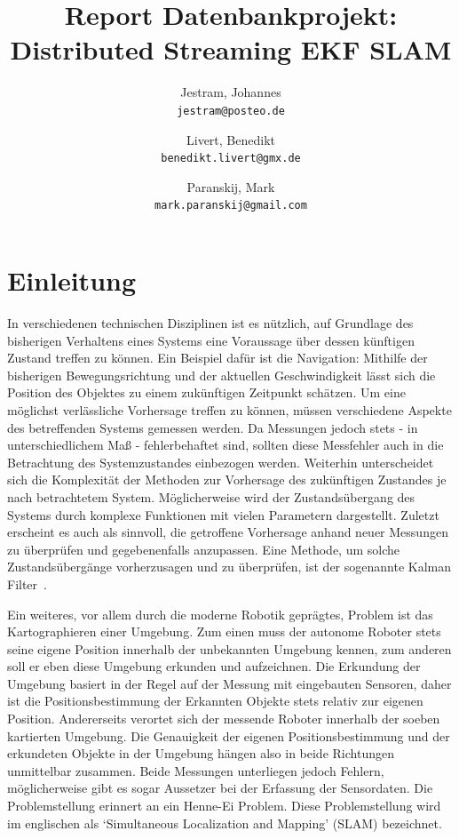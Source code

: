 \documentclass[11pt]{article}
\author{
  	Jestram, Johannes\\
  	\texttt{jestram@posteo.de}
	\and
	Livert, Benedikt\\
	\texttt{benedikt.livert@gmx.de}
	\and
	Paranskij, Mark\\
	\texttt{mark.paranskij@gmail.com}
}
\title{Report Datenbankprojekt: Distributed Streaming EKF SLAM}
\begin{document}
\maketitle
\newpage

\tableofcontents
\newpage

\section{Einleitung}\label{Einleitung}
In verschiedenen technischen Disziplinen ist es nützlich, auf Grundlage des bisherigen Verhaltens eines Systems eine Voraussage über dessen künftigen Zustand treffen zu können. Ein Beispiel dafür ist die Navigation: Mithilfe der bisherigen Bewegungsrichtung und der aktuellen Geschwindigkeit lässt sich die Position des Objektes zu einem zukünftigen Zeitpunkt schätzen. Um eine möglichst verlässliche Vorhersage treffen zu können, müssen verschiedene Aspekte des betreffenden Systems gemessen werden. Da Messungen jedoch stets - in unterschiedlichem Maß - fehlerbehaftet sind, sollten diese Messfehler auch in die Betrachtung des Systemzustandes einbezogen werden. Weiterhin unterscheidet sich die Komplexität der Methoden zur Vorhersage des zukünftigen Zustandes je nach betrachtetem System. Möglicherweise wird der Zustandsübergang des Systems durch komplexe Funktionen mit vielen Parametern dargestellt. Zuletzt erscheint es auch als sinnvoll, die getroffene Vorhersage anhand neuer Messungen zu überprüfen und gegebenenfalls anzupassen. Eine Methode, um solche Zustandsübergänge vorherzusagen und zu überprüfen, ist der sogenannte Kal\-man Filter~\cite{kalman1960new}.

Ein weiteres, vor allem durch die moderne Robotik geprägtes, Problem ist das Kartographieren einer Umgebung. Zum einen muss der autonome Roboter stets seine eigene Position innerhalb der unbekannten Umgebung kennen, zum anderen soll er eben diese Umgebung erkunden und aufzeichnen. Die Erkundung der Umgebung basiert in der Regel auf der Messung mit eingebauten Sensoren, daher ist die Positionsbestimmung der Erkannten Objekte stets relativ zur eigenen Position. Andererseits verortet sich der messende Roboter innerhalb der soeben kartierten Umgebung. Die Genauigkeit der eigenen Positionsbestimmung und der erkundeten Objekte in der Umgebung hängen also in beide Richtungen unmittelbar zusammen. Beide Messungen unterliegen jedoch Fehlern, möglicherweise gibt es sogar Aussetzer bei der Erfassung der Sensordaten. Die Problemstellung erinnert an ein Henne-Ei Problem. Diese Problemstellung wird im englischen als ‘Simultaneous Localization and Mapping’ (SLAM) bezeichnet.
\end{document}
